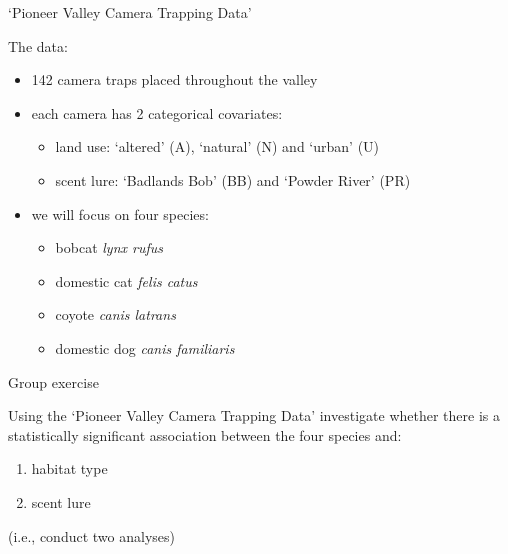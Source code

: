 \documentclass[
  ignorenonframetext,
  t]{beamer}
\providecommand{\tightlist}{%
  \setlength{\itemsep}{0pt}\setlength{\parskip}{0pt}}
\begin{document}
\begin{frame}{`Pioneer Valley Camera Trapping Data'}
\protect\hypertarget{pioneer-valley-camera-trapping-data}{}

The data:

\begin{itemize}
\tightlist
\item
  142 camera traps placed throughout the valley
\item
  each camera has 2 categorical covariates:

  \begin{itemize}
  \tightlist
  \item
    land use: `altered' (A), `natural' (N) and `urban' (U)
  \item
    scent lure: `Badlands Bob' (BB) and `Powder River' (PR)
  \end{itemize}
\item
  we will focus on four species:

  \begin{itemize}
  \tightlist
  \item
    bobcat \emph{lynx rufus}
  \item
    domestic cat \emph{felis catus}
  \item
    coyote \emph{canis latrans}
  \item
    domestic dog \emph{canis familiaris}
  \end{itemize}
\end{itemize}

\end{frame}

\begin{frame}{Group exercise}
\protect\hypertarget{group-exercise}{}

Using the `Pioneer Valley Camera Trapping Data' investigate whether
there is a statistically significant association between the four
species and:

\begin{enumerate}
\tightlist
\item
  habitat type
\item
  scent lure
\end{enumerate}

(i.e., conduct two analyses)


\end{frame}
\end{document}

